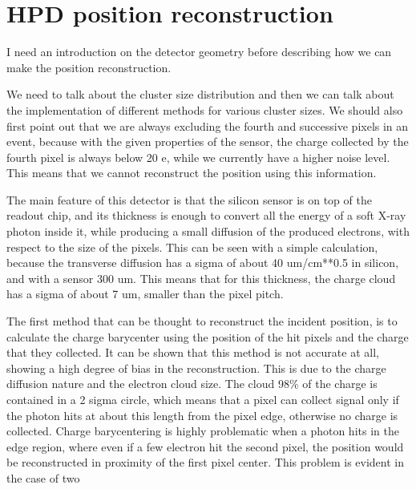 \chapter{HPD position reconstruction}
\label{chap:recon}

I need an introduction on the detector geometry before describing how we can make the position reconstruction.

We need to talk about the cluster size distribution and then we can talk about the implementation of different methods for various cluster sizes. We should also first point out that we are always excluding the fourth and successive pixels in an event, because with the given properties of the sensor, the charge collected by the fourth pixel is always below 20 e, while we currently have a higher noise level. This means that we cannot reconstruct the position using this information. 


The main feature of this detector is that the silicon sensor is on top of the readout chip, and its thickness is enough to convert all the energy of a soft X-ray photon inside it, while producing a small diffusion of the produced electrons, with respect to the size of the pixels. This can be seen with a simple calculation, because the transverse diffusion has a sigma of about 40 um/cm**0.5 in silicon, and with a sensor 300 um. This means that for this thickness, the charge cloud has a sigma of about 7 um, smaller than the pixel pitch.

The first method that can be thought to reconstruct the incident position, is to calculate the charge barycenter using the position of the hit pixels and the charge that they collected. It can be shown that this method is not accurate at all, showing a high degree of bias in the reconstruction. This is due to the charge diffusion nature and the electron cloud size. The cloud 98\% of the charge is contained in a 2 sigma circle, which means that a pixel can collect signal only if the photon hits at about this length from the pixel edge, otherwise no charge is collected. Charge barycentering is highly problematic when a photon hits in the edge region, where even if a few electron hit the second pixel, the position would be reconstructed in proximity of the first pixel center. This problem is evident in the case of two 